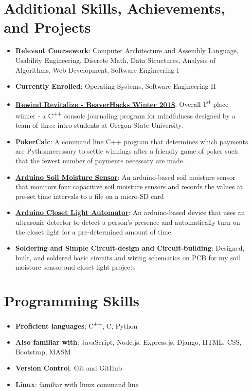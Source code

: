 \documentclass[letterpaper,11pt]{article}
\newcommand{\resumeItem}[2]{
  \item\small{
    \textbf{#1}{: #2 \vspace{-2pt}}
  }
}
\newcommand{\resumeSubItem}[2]{\resumeItem{#1}{#2}\vspace{-4pt}}
\newcommand{\resumeSubHeadingListStart}{\begin{itemize}[leftmargin=*]}
\newcommand{\resumeSubHeadingListEnd}{\end{itemize}}
\begin{document}
\section{Additional Skills, Achievements, and Projects}
  \resumeSubHeadingListStart
    \resumeSubItem{Relevant Coursework}
      {Computer Architecture and Assembly Language, Usability Engineering, Discrete Math, Data Structures, Analysis of Algorithms, Web Development, Software Engineering I}
    \resumeSubItem{Currently Enrolled}
    	{Operating Systems, Software Engineering II}
    \resumeSubItem{\href{https://github.com/jkbartos/rewind-revitalize}{Rewind Revitalize - BeaverHacks Winter 2018}}{Overall 1\textsuperscript{st} place winner - a C\textsuperscript{++} console journaling program for mindfulness designed by a team of three intro students at Oregon State University.}
    \resumeSubItem{\href{https://github.com/jordankbartos/PokerCalc}{PokerCalc}}
      {A command line C++ program that determines which payments are Pythonnecessary to settle winnings after a friendly game of poker such that the fewest number of payments necessary are made.}
     \resumeSubItem{\href{https://www.github.com/jordankbartos/soil-moisture-sensor}{Arduino Soil Moisture Sensor}}{An arduino-based soil moisture sensor that monitors four capacitive soil moisture sensors and records the values at pre-set time intervals to a file on a micro-SD card}
     \resumeSubItem{\href{}{Arduino Closet Light Automator}}{An arduino-based device that uses an ultrasonic detector to detect a person's presence and automatically turn on the closet light for a pre-determined amount of time.}
     \resumeSubItem{Soldering and Simple Circuit-design and Circuit-building}{Designed, built, and soldered basic circuits and wiring schematics on PCB for my soil moisture sensor and closet light projects}

    
  \resumeSubHeadingListEnd
\hfill

\section{Programming Skills}
  \resumeSubHeadingListStart
    \resumeSubItem{Proficient languages}{ C\textsuperscript{++}, C, Python}
    \resumeSubItem{Also familiar with}{JavaScript, Node.js, Express.js, Django, HTML, CSS, Bootstrap, MASM}
    \resumeSubItem{Version Control}{Git and GitHub}
    \resumeSubItem{Linux}{familiar with linux command line}
  \resumeSubHeadingListEnd
 \hfill

\end{document}
